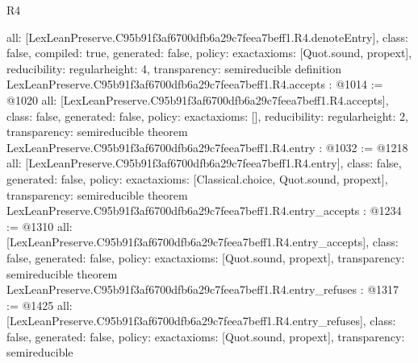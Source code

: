 \begin{lexlean}{R4}
\begin{coremodule}
{  all: [LexLeanPreserve.C95b91f3af6700dfb6a29c7feea7beff1.R4.denoteEntry],
  class: false,
  compiled: true,
  generated: false,
  policy: exact{axioms: [Quot.sound, propext]},
  reducibility: regular{height: 4},
  transparency: semireducible
}
definition LexLeanPreserve.C95b91f3af6700dfb6a29c7feea7beff1.R4.accepts : @1014 := @1020 {
  all: [LexLeanPreserve.C95b91f3af6700dfb6a29c7feea7beff1.R4.accepts],
  class: false,
  generated: false,
  policy: exact{axioms: []},
  reducibility: regular{height: 2},
  transparency: semireducible
}
theorem LexLeanPreserve.C95b91f3af6700dfb6a29c7feea7beff1.R4.entry : @1032 := @1218 {
  all: [LexLeanPreserve.C95b91f3af6700dfb6a29c7feea7beff1.R4.entry],
  class: false,
  generated: false,
  policy: exact{axioms: [Classical.choice, Quot.sound, propext]},
  transparency: semireducible
}
theorem LexLeanPreserve.C95b91f3af6700dfb6a29c7feea7beff1.R4.entry_accepts : @1234 := @1310 {
  all: [LexLeanPreserve.C95b91f3af6700dfb6a29c7feea7beff1.R4.entry_accepts],
  class: false,
  generated: false,
  policy: exact{axioms: [Quot.sound, propext]},
  transparency: semireducible
}
theorem LexLeanPreserve.C95b91f3af6700dfb6a29c7feea7beff1.R4.entry_refuses : @1317 := @1425 {
  all: [LexLeanPreserve.C95b91f3af6700dfb6a29c7feea7beff1.R4.entry_refuses],
  class: false,
  generated: false,
  policy: exact{axioms: [Quot.sound, propext]},
  transparency: semireducible
}


\end{coremodule}
\end{lexlean}
